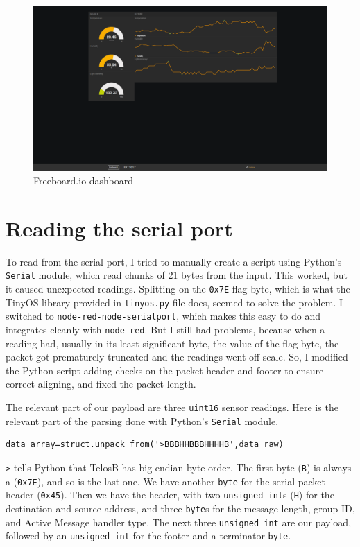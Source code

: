 \documentclass[11pt]{article}
\begin{document}
\begin{figure}
\includegraphics[width=\textwidth]{freeboard}
\caption{Freeboard.io dashboard}
\label{fig:freeboard}
\end{figure}

\section{Reading the serial port}
To read from the serial port, I tried to manually create a script using Python's \texttt{Serial} module, which read chunks of 21 bytes from the input. This worked, but it caused unexpected readings. Splitting on the \texttt{0x7E} flag byte, which is what the TinyOS library provided in \texttt{tinyos.py} file does, seemed to solve the problem. I switched to \texttt{node-red-node-serialport}, which makes this easy to do and integrates cleanly with \texttt{node-red}. But I still had problems, because when a reading had, usually in its least significant byte, the value of the flag byte, the packet got prematurely truncated and the readings went off scale. So, I modified the Python script adding checks on the packet header and footer to ensure correct aligning, and fixed the packet length.  
 
The relevant part of our payload are three \texttt{uint16} sensor readings. Here is the relevant part of the parsing done with Python's \texttt{Serial} module.

\begin{lstlisting}
data_array=struct.unpack_from('>BBBHHBBBHHHHB',data_raw)
\end{lstlisting}

\texttt{>} tells Python that TelosB has big-endian byte order. The first byte (\texttt{B}) is always a \texttt{\texttildelow} (\texttt{0x7E}), and so is the last one. We have another \texttt{byte} for the serial packet header (\texttt{0x45}). Then we have the header, with two \texttt{unsigned int}s (\texttt{H}) for the destination and source address, and three \texttt{byte}s for the message length, group ID, and Active Message handler type. The next three \texttt{unsigned int} are our payload, followed by an \texttt{unsigned int} for the footer and a terminator \texttt{byte}.
\end{document}
